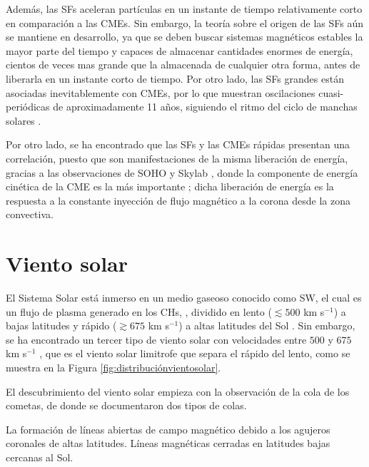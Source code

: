 Además, las \acp{SF} aceleran partículas en un instante de tiempo relativamente corto en comparación a las CMEs. Sin embargo, la teoría sobre el origen de las SFs aún se mantiene en desarrollo, ya que se deben buscar sistemas magnéticos estables la mayor parte del tiempo y capaces de almacenar cantidades enormes de energía, cientos de veces mas grande que la almacenada de cualquier otra forma, antes de liberarla en un instante corto de tiempo. Por otro lado, las \acp{SF} grandes están asociadas inevitablemente con \acp{CME}, por lo que muestran oscilaciones cuasi-periódicas de aproximadamente 11 años, siguiendo el ritmo del ciclo de manchas solares \parencite[e.g.,][]{kossobokov-2011}.

Por otro lado, se ha encontrado que las \acp{SF} y las \acp{CME} rápidas presentan una correlación, puesto que son manifestaciones de la misma liberación de energía, gracias a las observaciones de \ac{SOHO} y Skylab \parencite[e.g.,][]{low1994coronal, zhang-2001, kahler-1992,  feynman-1994, gosling-1976}, donde la componente de energía cinética de la CME es la más importante \parencite[e.g.,][]{emslie-2012}; dicha liberación de energía es la respuesta a la constante inyección de flujo magnético a la corona desde la zona convectiva.

\section{Viento solar}

El Sistema Solar está inmerso en un medio gaseoso conocido como \ac{SW}, el cual es un flujo de plasma generado en los \acp{CH}, \parencite[e.g.,][]{schwenn-2007, cranmer-2009, cranmer-2019, 1951ZA.....29..274B, parker-1958}, dividido en lento ($\lesssim 500$ km s$^{-1}$) a bajas latitudes y rápido ($\gtrsim675$ km s$^{-1}$) a altas latitudes del Sol \parencite[e.g.,][]{stakhiv-2015}. Sin embargo, se ha encontrado un tercer tipo de viento solar con velocidades entre $500$ y $675$ km s$^{-1}$ \parencite[e.g.,][]{stakhiv-2015}, que es el viento solar limitrofe que separa el rápido del lento, como se muestra en la Figura \ref{fig:distribuciónvientosolar}. 

El descubrimiento del viento solar empieza con la observación de la cola de los cometas, de donde se documentaron dos tipos de colas. 

La formación de líneas abiertas de campo magnético debido a los agujeros coronales de altas latitudes. %
Líneas magnéticas cerradas en latitudes bajas cercanas al Sol. %


